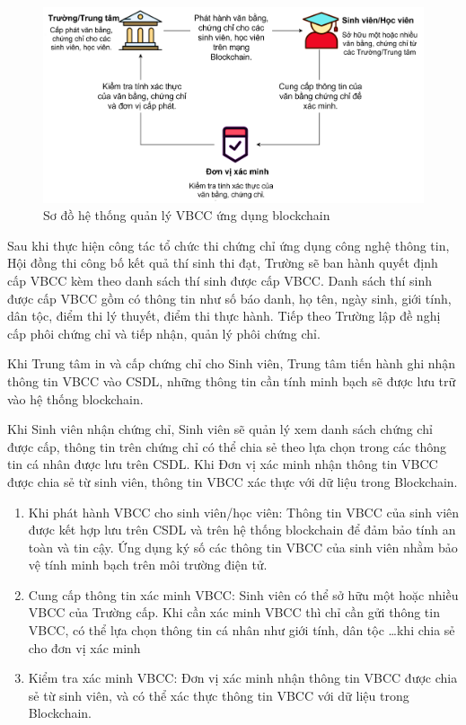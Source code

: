 \begin{figure}[htbp]
\centering
\includegraphics[width=.9\linewidth]{img/vbcc.jpg}
\caption{Sơ đồ hệ thống quản lý VBCC ứng dụng blockchain}
\label{fig:vbcc}
\end{figure}

Sau khi thực hiện công tác tổ chức thi chứng chỉ ứng dụng công nghệ thông tin, Hội đồng thi công bố kết quả thí sinh thi đạt, Trường sẽ ban hành quyết định cấp VBCC kèm theo danh sách thí sinh được cấp VBCC.
Danh sách thí sinh được cấp VBCC gồm có thông tin như số báo danh, họ tên, ngày sinh, giới tính, dân tộc, điểm thi lý thuyết, điểm thi thực hành.
Tiếp theo Trường lập đề nghị cấp phôi chứng chỉ và tiếp nhận, quản lý phôi chứng chỉ.

Khi Trung tâm in và cấp chứng chỉ cho Sinh viên, Trung tâm tiến hành ghi nhận thông tin VBCC vào CSDL, những thông tin cần tính minh bạch sẽ được lưu trữ vào hệ thống blockchain.

Khi Sinh viên nhận chứng chỉ, Sinh viên sẽ quản lý xem danh sách chứng chỉ được cấp, thông tin trên chứng chỉ có thể chia sẻ theo lựa chọn trong các thông tin cá nhân được lưu trên CSDL. Khi Đơn vị xác minh nhận thông tin VBCC được chia sẻ từ sinh viên, thông tin VBCC xác thực với dữ liệu trong Blockchain.

\begin{enumerate}
\item Khi phát hành VBCC cho sinh viên/học viên:
Thông tin VBCC của sinh viên được kết hợp lưu trên CSDL và trên hệ thống blockchain để đảm bảo tính an toàn và tin cậy. Ứng dụng ký số các thông tin VBCC của sinh viên nhằm bảo vệ tính minh bạch trên môi trường điện tử.

\item Cung cấp thông tin xác minh VBCC:
Sinh viên có thể sở hữu một hoặc nhiều VBCC của Trường cấp. Khi cần xác minh VBCC thì chỉ cần gửi thông tin VBCC, có thể lựa chọn thông tin cá nhân như giới tính, dân tộc \ldots khi chia sẻ cho đơn vị xác minh

\item Kiểm tra xác minh VBCC:
Đơn vị xác minh nhận thông tin VBCC được chia sẻ từ sinh viên, và có thể xác thực thông tin VBCC với dữ liệu trong Blockchain.

\end{enumerate}

